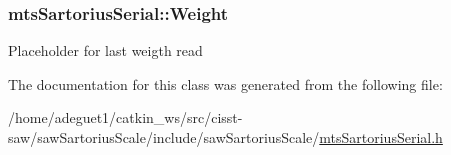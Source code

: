 \hypertarget{classmts_sartorius_serial_a5fd5e0fcfe8b161a1663059026bcd298}{
\subsubsection[{Weight}]{ mts\-Sartorius\-Serial\-::\-Weight\hspace{0.3cm}{\ttfamily [protected]}}}\label{classmts_sartorius_serial_a5fd5e0fcfe8b161a1663059026bcd298}
Placeholder for last weigth read 

The documentation for this class was generated from the following file\-:\begin{DoxyCompactItemize}
\item 
/home/adeguet1/catkin\-\_\-ws/src/cisst-\/saw/saw\-Sartorius\-Scale/include/saw\-Sartorius\-Scale/\hyperlink{mts_sartorius_serial_8h}{mts\-Sartorius\-Serial.\-h}\end{DoxyCompactItemize}

